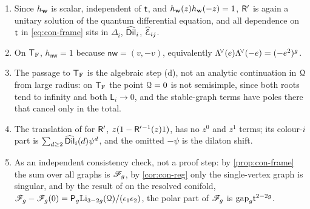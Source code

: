 \begin{rmk}\leavevmode
\begin{enumerate}
\item Since $h_{\mathbf{w}}$ is scalar, independent of $\mathsf{t}$, and $h_{\mathbf{w}}(z)h_{\mathbf{w}}(-z)=1$, $\mathsf{R}'$ is again a unitary solution of the quantum differential equation, and all dependence on $\mathsf{t}$ in \cref{eq:con-frame} sits in $\Delta_i$, $\widehat{\mathsf{Dil}}_i$, $\widehat{\mathcal{E}}_{ij}$.
\item On $\mathsf{T}_{\mathrm{F}}$, $h_{\mathsf{nw}}=1$ because $\mathsf{nw}=(v,-v)$, equivalently $\Lambda^{\!\vee}(e)\Lambda^{\!\vee}(-e)=(-e^2)^g$.
\item The passage to $\mathsf{T}_{\mathrm{F}}$ is the algebraic step (d), not an analytic continuation in $\mathcal{Q}$ from large radius: on $\mathsf{T}_{\mathrm{F}}$ the point $\mathcal{Q}=0$ is not semisimple, since both roots tend to infinity and both $\mathsf{L}_i\to 0$, and the stable-graph terms have poles there that cancel only in the total.
\item The translation of \cite[Def.~2.13]{PPZ15} for $\mathsf{R}'$, $z(1-\mathsf{R}'{}^{-1}(z)1)$, has no $z^0$ and $z^1$ terms; its colour-$i$ part is $\sum_{d\geq 2}\widehat{\mathsf{Dil}}_i(d)\psi^d$, and the omitted $-\psi$ is the dilaton shift.
\item As an independent consistency check, not a proof step: by \cref{prop:con-frame} the sum over all graphs is $\mathscr{F}_g$, by \cref{cor:con-reg} only the single-vertex graph is singular, and by the result of \cite{BS} on the resolved conifold, $\mathscr{F}_g-\mathscr{F}_g(0)=\mathsf{P}_g\mathrm{Li}_{3-2g}(\mathcal{Q})/(\epsilon_1\epsilon_2)$, the polar part of $\mathscr{F}_g$ is $\mathrm{gap}_g\mathsf{t}^{2-2g}$. 
\end{enumerate}
\end{rmk}
